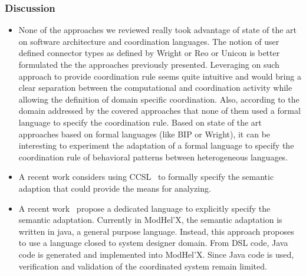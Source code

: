 \subsubsection{Discussion}
 	\begin{itemize}

 		\item None of the approaches we reviewed really took advantage of state of the art on software architecture and coordination languages.
 		The notion of user defined connector types as defined by Wright or Reo or Unicon is better formulated the the approaches previously presented. Leveraging on such approach to provide coordination rule seems quite intuitive and would bring a clear separation between the computational and coordination activity while allowing the definition of domain specific coordination. Also, according to the domain addressed by the covered approaches that none of them used a formal language to specify the coordination rule. Based on state of the art approaches based on formal languages (like BIP or Wright), it can be interesting to experiment the adaptation of a formal language to specify the coordination rule of behavioral patterns between heterogeneous languages.
 		\item  A recent work considers using CCSL~\cite{semanticadaptccsl} to formally specify the semantic adaption that could provide the means for analyzing.
 		
 		\item A recent work~\cite{semanticadaptlang} propose a dedicated language to explicitly specify the semantic adaptation. Currently in ModHel'X, the semantic adaptation is written in java, \ie a general purpose language. Instead, this approach proposes to use a language closed to system designer domain. From DSL code, Java code is generated and implemented into ModHel'X. Since Java code is used, verification and validation of the coordinated system remain limited.   
 		
 		 
 		\end{itemize}